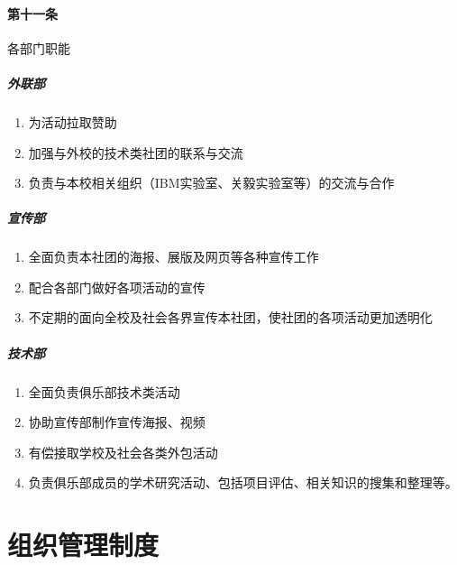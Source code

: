 \documentclass{club}
\begin{document}
\paragraph{第十一条}各部门职能
\subparagraph{外联部}
\begin{enumerate}
	\item 为活动拉取赞助
	\item 加强与外校的技术类社团的联系与交流
	\item 负责与本校相关组织（IBM实验室、关毅实验室等）的交流与合作
\end{enumerate}
\subparagraph{宣传部}
\begin{enumerate}
	\item 全面负责本社团的海报、展版及网页等各种宣传工作
	\item 配合各部门做好各项活动的宣传
	\item 不定期的面向全校及社会各界宣传本社团，使社团的各项活动更加透明化
\end{enumerate}
\subparagraph{技术部}
\begin{enumerate}
	\item 全面负责俱乐部技术类活动
	\item 协助宣传部制作宣传海报、视频
	\item 有偿接取学校及社会各类外包活动
	\item 负责俱乐部成员的学术研究活动、包括项目评估、相关知识的搜集和整理等。
\end{enumerate}

\section{组织管理制度}
\end{document}
